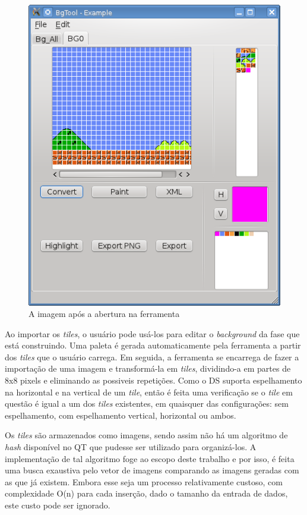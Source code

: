\documentclass[brazil]{abnt}
\begin{document}
\begin{figure}[h!]
\centering
\includegraphics[scale=1]{imgs/bgtool1.png}
\caption{A imagem após a abertura na ferramenta} 
\end{figure}

Ao importar os \textit{tiles}, o usuário pode usá-los para editar o \textit{background} da fase que está construindo. Uma paleta é gerada automaticamente pela ferramenta a partir dos \textit{tiles} que o usuário carrega. Em seguida, a ferramenta se encarrega de fazer a importação de uma imagem e transformá-la em \textit{tiles}, dividindo-a em partes de 8x8 pixels e eliminando as possiveis repetições. Como o DS suporta espelhamento na horizontal e na vertical de um \textit{tile}, então é feita uma verificação se o \textit{tile} em questão é igual a um dos \textit{tiles} existentes, em quaisquer das configurações: sem espelhamento, com espelhamento vertical, horizontal ou ambos.

Os \textit{tiles} são armazenados como imagens, sendo assim não há um algoritmo de \textit{hash} disponível no QT que pudesse ser utilizado para organizá-los. A implementação de tal algoritmo foge ao escopo deste trabalho e por isso, é feita uma busca exaustiva pelo vetor de imagens comparando as imagens geradas com as que já existem. Embora esse seja um processo relativamente custoso, com complexidade O(n) para cada inserção, dado o tamanho da entrada de dados, este custo pode ser ignorado.
\end{document}
